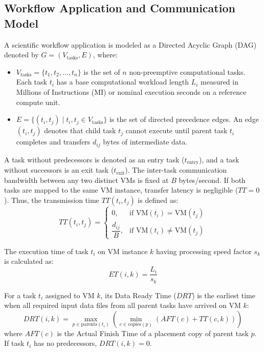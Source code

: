 \documentclass[journal]{IEEEtran}
\begin{document}
\subsection{Workflow Application and Communication Model}
A scientific workflow application is modeled as a Directed Acyclic Graph (DAG) denoted by $G = (V_{\text{tasks}}, E)$, where:
\begin{itemize}
    \item $V_{\text{tasks}} = \{t_1, t_2, \dots, t_n\}$ is the set of $n$ non-preemptive computational tasks. Each task $t_i$ has a base computational workload length $L_i$ measured in Millions of Instructions (MI) or nominal execution seconds on a reference compute unit.
    \item $E = \{(t_i, t_j) \mid t_i, t_j \in V_{\text{tasks}}\}$ is the set of directed precedence edges. An edge $(t_i, t_j)$ denotes that child task $t_j$ cannot execute until parent task $t_i$ completes and transfers $d_{ij}$ bytes of intermediate data.
\end{itemize}

A task without predecessors is denoted as an entry task ($t_{\text{entry}}$), and a task without successors is an exit task ($t_{\text{exit}}$). The inter-task communication bandwidth between any two distinct VMs is fixed at $B$ bytes/second. If both tasks are mapped to the same VM instance, transfer latency is negligible ($TT = 0$). Thus, the transmission time $TT(t_i, t_j)$ is defined as:
\begin{equation}
TT(t_i, t_j) = 
\begin{cases} 
0, & \text{if } \text{VM}(t_i) = \text{VM}(t_j) \\ 
\dfrac{d_{ij}}{B}, & \text{if } \text{VM}(t_i) \ne \text{VM}(t_j)
\end{cases}
\label{eq:tt}
\end{equation}

The execution time of task $t_i$ on VM instance $k$ having processing speed factor $s_k$ is calculated as:
\begin{equation}
ET(i, k) = \frac{L_i}{s_k}
\label{eq:et}
\end{equation}

For a task $t_i$ assigned to VM $k$, its Data Ready Time ($DRT$) is the earliest time when all required input data files from all parent tasks have arrived on VM $k$:
\begin{equation}
DRT(i, k) = \max_{p \in \text{parents}(t_i)} \left( \min_{c \in \text{copies}(p)} \left( AFT(c) + TT(c, k) \right) \right)
\label{eq:drt}
\end{equation}
where $AFT(c)$ is the Actual Finish Time of a placement copy of parent task $p$. If task $t_i$ has no predecessors, $DRT(i, k) = 0$.
\end{document}
